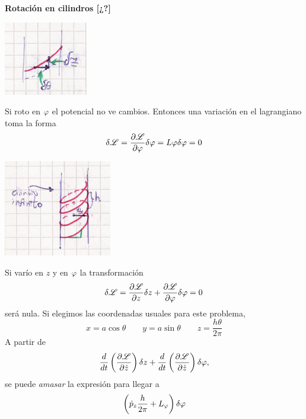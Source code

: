 \documentclass[10pt,oneside]{CBFT_book}
\begin{document}
\begin{ejemplo}{\bf Rotación en cilindros [¿?]}

\includegraphics[scale=0.4]{images/fig_mc_simetria_rot2.jpg}

Si roto en $\vp$ el potencial no ve cambios. Entonces una variación en el lagrangiano toma la forma
\[
	\delta \Lag = \dpar{\Lag}{\vp}\delta\vp = L\vp \delta\vp = 0
\]

\includegraphics[scale=0.4]{images/fig_mc_simetria_rot1.jpg}

Si varío en $z$ y en $\vp$ la transformación
\[
	\delta \Lag = \dpar{\Lag}{z}\delta z + \dpar{\Lag}{\vp}\delta\vp = 0
\]
será nula. Si elegimos las coordenadas usuales para este problema,
\[
	x = a \cos \theta \qquad y = a \sin \theta \qquad z = \frac{h\theta}{2\pi}
\]
A partir de
\[
	\dtot{}{t}\left( \dpar{\Lag}{\dot{z}} \right)\delta z + \dtot{}{t}\left( \dpar{\Lag}{\dot{z}} \right)\delta\vp,
\]
se puede {\it amasar} la expresión para llegar a
\[
	\left( \dot{p}_z  \frac{h}{2\pi} + L_\vp \right) \delta \vp
\]


 
\end{ejemplo}
\end{document}
